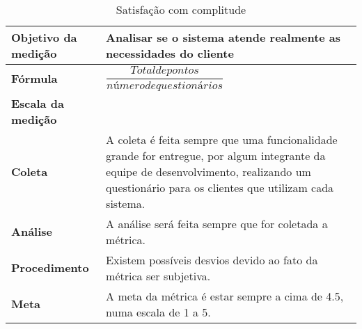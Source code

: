 \begin{table}[H]
\centering
\begin{tabular}{|p{4cm}|p{5cm}|}
\hline
	\textbf{Objetivo da medição} &
	Analisar se o sistema atende realmente as necessidades do cliente
	\\ \hline
	\textbf{Fórmula} &
	$\dfrac{Total de pontos}{número de questionários}$
	\\ \hline
	\textbf{Escala da medição} &

	\\ \hline
	\textbf{Coleta} &
	A coleta é feita sempre que uma funcionalidade grande for entregue, por algum integrante da equipe de desenvolvimento, realizando um questionário para os clientes que utilizam cada sistema.
	\\ \hline
	\textbf{Análise} &
	A análise será feita sempre que for coletada a métrica.
	\\ \hline
	\textbf{Procedimento} &
	Existem possíveis desvios devido ao fato da métrica ser subjetiva.
	\\ \hline
  \textbf{Meta} &
	A meta da métrica é estar sempre a cima de 4.5, numa escala de 1 a 5.
  \\ \hline
\end{tabular}
\caption{Satisfação com complitude}
\label{tab:satisfacao_complitude}
\end{table}

